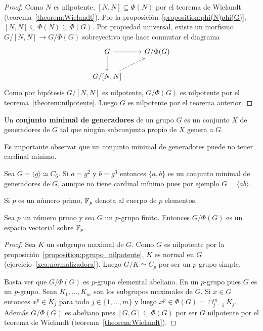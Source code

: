 \begin{proof}
	Como $N$ es nilpotente, $[N,N]\subseteq\Phi(N)$ por el
	teorema de Wielandt (teorema~\ref{theorem:Wielandt}).	
	Por la proposición~\ref{proposition:phi(N)phi(G)},
	$[N,N]\subseteq\Phi(N)\subseteq\Phi(G)$. 
	Por propiedad universal, existe un morfismo
	$G/[N,N]\to G/\Phi(G)$ sobreyectivo que hace conmutar el diagrama
    \[
    \begin{tikzcd}
	G & {G/\Phi(G)} \\
	{G/[N,N]}
	\arrow[from=1-1, to=1-2]
	\arrow[from=1-1, to=2-1]
	\arrow[dashed, from=2-1, to=1-2]
    \end{tikzcd}
    \]
	Como por hipótesis $G/[N,N]$ es nilpotente, $G/\Phi(G)$ es nilpotente por
	el teorema~\ref{theorem:nilpotente}. Luego $G$ es nilpotente por el
	teorema anterior. %
\end{proof}

\begin{definition}
	Un \textbf{conjunto minimal de generadores} de un grupo $G$ es un conjunto
	$X$ de generadores de $G$ tal que ningún subconjunto propio de $X$ genera a
	$G$.
\end{definition}

Es importante observar que un conjunto minimal de generadores puede no
tener cardinal mínimo. 
	
\begin{example}
	Sea $G=\langle g\rangle\simeq C_6$.  Si $a=g^2$ y
	$b=g^3$ entonces $\{a,b\}$ es un conjunto minimal de generadores de $G$,
	aunque no tiene cardinal mínimo pues por ejemplo $G=\langle ab\rangle$.
\end{example}
	
Si $p$ es un número primo, $\mathbb{F}_p$ denota al cuerpo de $p$ elementos. 

\begin{lemma}
	\label{lemma:Burnside:minimal}
	Sea $p$ un número primo y sea 
	$G$ un $p$-grupo finito. Entonces $G/\Phi(G)$ es un espacio vectorial
	sobre $\mathbb{F}_p$.
\end{lemma}

\begin{proof}
	Sea $K$ un subgrupo maximal de $G$. Como $G$ es nilpotente por la
	proposición~\ref{proposition:pgrupo_nilpotente}, $K$ es normal en $G$
	(ejercicio~\ref{xca:normalizadora}). Luego $G/K\simeq C_p$ por ser un $p$-grupo
	simple. 
	
	Basta ver que $G/\Phi(G)$ es $p$-grupo elemental abeliano. En un $p$-grupo
	pues $G$ es un $p$-grupo.  Sean $K_1,\dots,K_m$ son los subgrupos maximales
	de $G$. Si $x\in G$ entonces $x^p\in K_j$ para todo $j\in\{1,\dots,m\}$ y
	luego $x^p\in\Phi(G)=\cap_{j=1}^m K_j$. Además $G/\Phi(G)$ es abeliano pues
	$[G,G]\subseteq \Phi(G)$ por ser $G$ nilpotente por el teorema de Wielandt 
	(teorema~\ref{theorem:Wielandt}). 
\end{proof}

